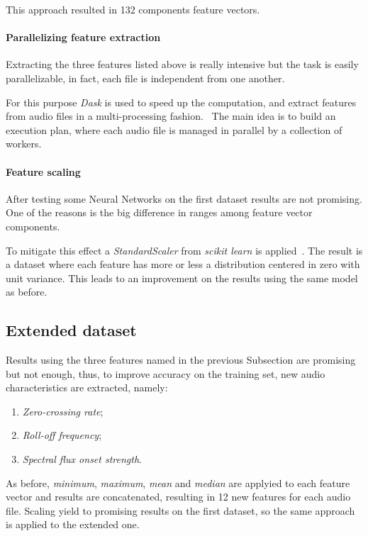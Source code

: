 This approach resulted in 132 components feature vectors.

\paragraph{Parallelizing feature extraction}
Extracting the three features listed above is really intensive 
but the task is easily parallelizable, in fact, each file is independent 
from one another.

For this purpose \emph{Dask} is used to speed up the computation, and 
extract features from audio files in a multi-processing fashion.~\cite{dask}
The main idea is to build an execution plan, where each audio file 
is managed in parallel by a collection of workers.

\paragraph{Feature scaling}
After testing some Neural Networks on the first dataset results 
are not promising. One of the reasons is the big difference in 
ranges among feature vector components.

To mitigate this effect a \emph{StandardScaler} from \emph{scikit learn} is applied~\cite{scaler}.
The result is a dataset where each feature has more or less a distribution 
centered in zero with unit variance.
This leads to an improvement on the results using the same
model as before. 

\subsection{Extended dataset}
\label{extended-dataset}

Results using the three features named in the previous Subsection 
are promising but not enough, thus, to improve accuracy on the training set, 
new audio characteristics are extracted, namely: 
\begin{enumerate}
    \item \emph{Zero-crossing rate};
    \item \emph{Roll-off frequency};
    \item \emph{Spectral flux onset strength}.
\end{enumerate}
As before, \emph{minimum}, \emph{maximum}, \emph{mean} 
and \emph{median} are applyied to each feature vector and 
results are concatenated, resulting in 12 new features for each 
audio file.
Scaling yield to promising results on the first dataset, 
so the same approach is applied to the extended one.

